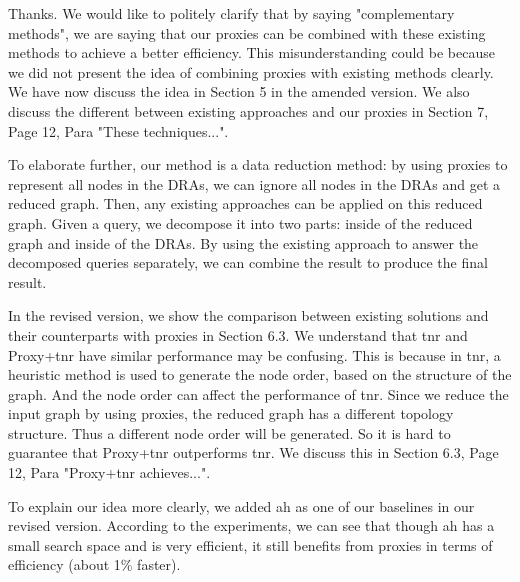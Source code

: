 \documentclass[11pt]{letter}
\newcommand{\vs}{\vspace{1ex}}
\newcommand{\svs}{\vspace{0.36ex}}
\newcommand{\ah}{{\sc ah}\xspace}
\newcommand{\tnr}{{\sc tnr}\xspace}
\begin{document}
Thanks. We would like to politely clarify that by saying "complementary methods", we are saying that our proxies can be combined with these existing methods to achieve a better efficiency. This misunderstanding could be because we did not present the idea of combining proxies with existing methods clearly. We have now discuss the idea in Section 5 in the amended version. We also discuss the different between existing approaches and our proxies in Section 7, Page 12, Para "These techniques...".

To elaborate further, our method is a data reduction method: by using proxies to represent all nodes in the DRAs, we can ignore all nodes in the DRAs and get a reduced graph. Then, any existing approaches can be applied on this reduced graph. Given a query, we decompose it into two parts: inside of the reduced graph and inside of the DRAs. By using the existing approach to answer the decomposed queries separately, we can combine the result to produce the final result.

In the revised version, we show the comparison between existing solutions and their counterparts with proxies in Section 6.3. We understand that \tnr and Proxy+\tnr have similar performance may be confusing. This is because in \tnr, a heuristic method is used to generate the node order, based on the structure of the graph. And the node order can affect the performance of \tnr. Since we reduce the input graph by using proxies, the reduced graph has a different topology structure. Thus a different node order will be generated. So it is hard to guarantee that Proxy+\tnr outperforms \tnr. We discuss this in Section 6.3, Page 12, Para "Proxy+\tnr achieves...".

To explain our idea more clearly, we added \ah as one of our baselines in our revised version. According to the experiments, we can see that though \ah has a small search space and is very efficient, it still benefits from proxies in terms of efficiency (about 1\% faster).



\vs{}
\svs
\end{document}
